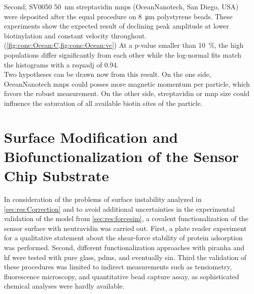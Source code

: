 Second, SV0050 \SI{50}{\nano\meter} streptavidin \glspl{mnp} (OceanNanotech, San Diego, USA) were deposited after the equal procedure on \SI{8}{\micro\meter} polystyrene beads. These experiments show the expected result of declining peak amplitude at lower biotinylation and constant velocity throughout. (\cref{fig:conc:Ocean:C,fig:conc:Ocean:vc}) At a p-value smaller than \SI{10}{\percent}, the high populations differ significantly from each other while the log-normal fits match the histograms with a \gls{rsquadj} of \num{0.94}.\\
Two hypotheses can be drawn now from this result. On the one side, OceanNanotech \glspl{mnp} could posses more magnetic momentum per particle, which favors the robust measurement. On the other side, streptavidin or \gls{mnp} size could influence the saturation of all available biotin sites of the particle. 



\clearpage
\section{Surface Modification and Biofunctionalization of the Sensor Chip Substrate}
\label{sec:res:surfMod}
In consideration of the problems of surface instability analyzed in \cref{sec:res:Correction} and to avoid additional uncertainties in the experimental validation of the model from \cref{sec:res:forcesim}, a covalent functionalization of the sensor surface with neutravidin was carried out. First, a plate reader experiment for a qualitative statement about the shear-force stability of protein adsorption was performed. Second, different functionalization approaches with \gls{piranha} and \gls{hf} were tested with pure glass, \gls{pdms}, and eventually \gls{sin}. Third the validation of these procedures was limited to indirect measurements such as tensiometry, fluorescence microscopy, and quantitative bead capture assay, as sophisticated chemical analyses were hardly available.

